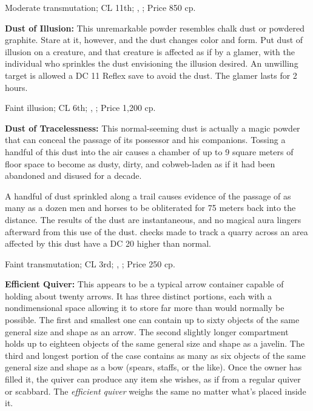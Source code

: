 Moderate transmutation; CL 11th; , ; Price 850 cp.



\textbf{Dust of Illusion:} This unremarkable powder resembles chalk dust or powdered graphite. Stare at it, however, and the dust changes color and form. Put dust of illusion on a creature, and that creature is affected as if by a  glamer, with the individual who sprinkles the dust envisioning the illusion desired. An unwilling target is allowed a DC 11 Reflex save to avoid the dust. The glamer lasts for 2 hours.

Faint illusion; CL 6th; , ; Price 1,200 cp.



\textbf{Dust of Tracelessness:} This normal-seeming dust is actually a magic powder that can conceal the passage of its possessor and his companions. Tossing a handful of this dust into the air causes a chamber of up to 9 square meters of floor space to become as dusty, dirty, and cobweb-laden as if it had been abandoned and disused for a decade.

A handful of dust sprinkled along a trail causes evidence of the passage of as many as a dozen men and horses to be obliterated for 75 meters back into the distance. The results of the dust are instantaneous, and no magical aura lingers afterward from this use of the dust.  checks made to track a quarry across an area affected by this dust have a DC 20 higher than normal.

Faint transmutation; CL 3rd; , ; Price 250 cp.



\textbf{Efficient Quiver:} This appears to be a typical arrow container capable of holding about twenty arrows. It has three distinct portions, each with a nondimensional space allowing it to store far more than would normally be possible. The first and smallest one can contain up to sixty objects of the same general size and shape as an arrow. The second slightly longer compartment holds up to eighteen objects of the same general size and shape as a javelin. The third and longest portion of the case contains as many as six objects of the same general size and shape as a bow (spears, staffs, or the like). Once the owner has filled it, the quiver can produce any item she wishes, as if from a regular quiver or scabbard. The \emph{efficient quiver} weighs the same no matter what's placed inside it.

